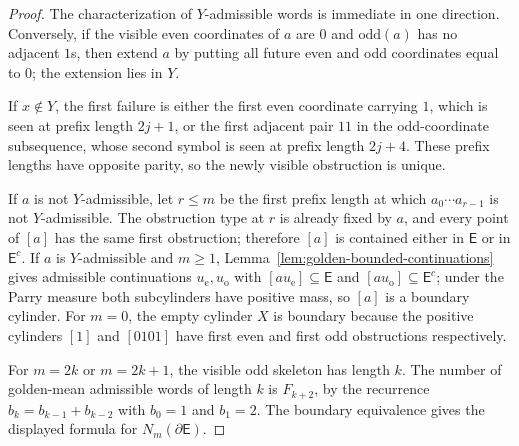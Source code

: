\documentclass{etds}%
\numberwithin{equation}{section}
\theoremstyle{plain}
\theoremstyle{definition}
\theoremstyle{remark}
\begin{document}
\begin{proof}
The characterization of $Y$-admissible words is immediate in one direction.
Conversely, if the visible even coordinates of $a$ are $0$ and
$\mathrm{odd}(a)$ has no adjacent $1$s, then extend $a$ by putting all future
even and odd coordinates equal to $0$; the extension lies in $Y$.

If $x\notin Y$, the first failure is either the first even coordinate carrying
$1$, which is seen at prefix length $2j+1$, or the first adjacent pair $11$ in
the odd-coordinate subsequence, whose second symbol is seen at prefix length
$2j+4$.  These prefix lengths have opposite parity, so the newly visible
obstruction is unique.

If $a$ is not $Y$-admissible, let $r\le m$ be the first prefix length at which
$a_0\cdots a_{r-1}$ is not $Y$-admissible.  The obstruction type at $r$ is
already fixed by $a$, and every point of $[a]$ has the same first obstruction;
therefore $[a]$ is contained either in $\mathsf{E}$ or in $\mathsf{E}^c$.
If $a$ is $Y$-admissible and $m\ge 1$, Lemma~\ref{lem:golden-bounded-continuations}
gives admissible continuations $u_{\mathrm e},u_{\mathrm o}$ with
$[au_{\mathrm e}]\subseteq\mathsf{E}$ and
$[au_{\mathrm o}]\subseteq\mathsf{E}^c$; under the Parry measure both
subcylinders have positive mass, so $[a]$ is a boundary cylinder.  For $m=0$, the empty cylinder
$X$ is boundary because the positive cylinders $[1]$ and $[0101]$ have first
even and first odd obstructions respectively.

For $m=2k$ or $m=2k+1$, the visible odd skeleton has length $k$.  The number
of golden-mean admissible words of length $k$ is $F_{k+2}$, by the recurrence
$b_k=b_{k-1}+b_{k-2}$ with $b_0=1$ and $b_1=2$.  The boundary equivalence gives
the displayed formula for $N_m(\partial\mathsf{E})$.
\end{proof}
\end{document}
